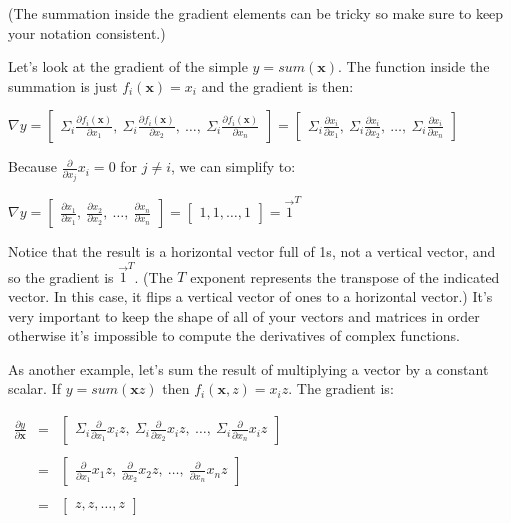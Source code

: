 \documentclass[11pt]{article}
\begin{document}
(The summation inside the gradient elements can be tricky so make sure to keep your notation consistent.)

Let's look at the gradient of the simple $y = sum(\mathbf{x})$. The function inside the summation is just $f_i(\mathbf{x}) = x_i$ and the gradient is then:

$\nabla y = \begin{bmatrix} \Sigma_i \frac{\partial f_i(\mathbf{x})}{\partial x_1},~ \Sigma_i \frac{\partial f_i(\mathbf{x})}{\partial x_2},~ \ldots,~ \Sigma_i \frac{\partial f_i(\mathbf{x})}{\partial x_n}  \end{bmatrix} = \begin{bmatrix} \Sigma_i \frac{\partial x_i}{\partial x_1},~ \Sigma_i \frac{\partial x_i}{\partial x_2},~ \ldots,~ \Sigma_i \frac{\partial x_i}{\partial x_n}  \end{bmatrix}$

Because $\frac{\partial}{\partial x_j} x_i = 0$ for $j \neq i$, we can simplify to:

$\nabla y = \begin{bmatrix} \frac{\partial x_1}{\partial x_1},~ \frac{\partial x_2}{\partial x_2},~ \ldots,~ \frac{\partial x_n}{\partial x_n}  \end{bmatrix} = \begin{bmatrix}1, 1, \ldots, 1\end{bmatrix} = \vec{1}^T$

Notice that the result is a horizontal vector full of 1s, not a vertical vector, and so the gradient is $\vec{1}^T$. (The $T$ exponent represents the transpose of the indicated vector. In this case, it flips a vertical vector of ones to a horizontal vector.) It's very important to keep the shape of all of your vectors and matrices in order otherwise it's impossible to compute the derivatives of complex functions.

As another example, let's sum the result of multiplying a vector by a constant scalar.  If $y = sum(\mathbf{x} z)$ then $f_i(\mathbf{x},z) = x_i z$. The gradient is:

$
\begin{array}{lcl}
\frac{\partial y}{\partial \mathbf{x}} & = & \begin{bmatrix} \Sigma_i \frac{\partial}{\partial x_1} x_i z,~ \Sigma_i \frac{\partial }{\partial x_2} x_i z,~ \ldots,~ \Sigma_i \frac{\partial}{\partial x_n} x_i z  \end{bmatrix}\\\\
 & = & \begin{bmatrix} \frac{\partial}{\partial x_1} x_1 z,~ \frac{\partial }{\partial x_2} x_2 z,~ \ldots,~ \frac{\partial}{\partial x_n} x_n z  \end{bmatrix}\\\\
 & = & \begin{bmatrix} z, z, \ldots, z \end{bmatrix}\\\\
\end{array}
$
\end{document}
